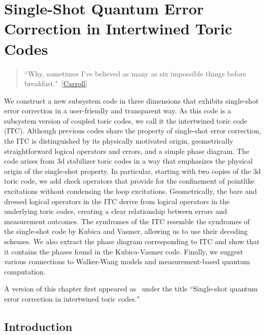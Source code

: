 
\chapter{Single-Shot Quantum Error Correction in Intertwined Toric Codes }\label{chp:single-shot}

\begin{quotation}
	 ``Why, sometimes I've believed as many as six impossible things before breakfast."~[\hyperlink{cite.\therefsection @Carroll2002Alice}{Carroll}]
\end{quotation}

We construct a new subsystem code in three dimensions that exhibits single-shot error correction in a user-friendly and transparent way. As this code is a subsystem version of coupled toric codes, we call it the intertwined toric code (ITC). Although previous codes share the property of single-shot error correction, the ITC is distinguished by its physically motivated origin, geometrically straightforward logical operators and errors, and a simple phase diagram. The code arises from 3d stabilizer toric codes in a way that emphasizes the physical origin of the single-shot property. In particular, starting with two copies of the 3d toric code, we add check operators that provide for the confinement of pointlike excitations without condensing the loop excitations. Geometrically, the bare and dressed logical operators in the ITC derive from logical operators in the underlying toric codes, creating a clear relationship between errors and measurement outcomes. The syndromes of the ITC resemble the syndromes of the single-shot code by Kubica and Vasmer, allowing us to use their decoding schemes. We also extract the phase diagram corresponding to ITC and show that it contains the phases found in the Kubica-Vasmer code. Finally, we suggest various connections to Walker-Wang models and measurement-based quantum computation.

A version of this chapter first appeared as~\cite{Stahl2023Single} under the title ``Single-shot quantum error correction in intertwined toric codes."

\section{Introduction} \label{sec:intro}

